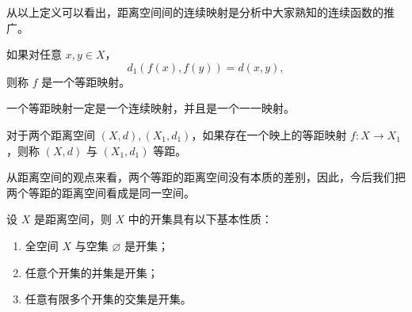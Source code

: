 从以上定义可以看出，距离空间间的连续映射是分析中大家熟知的连续函数的推广。  
\begin{definition}[等距映射]
    

如果对任意 $x,y \in X$，  
\[
d_1(f(x), f(y)) = d(x,y),
\]
则称 $f$ 是一个等距映射。  
\end{definition}
一个等距映射一定是一个连续映射，并且是一个一一映射。  

对于两个距离空间 $(X,d), (X_1,d_1)$，如果存在一个映上的等距映射 $f: X \to X_1$，则称 $(X,d)$ 与 $(X_1,d_1)$ 等距。  

从距离空间的观点来看，两个等距的距离空间没有本质的差别，因此，今后我们把两个等距的距离空间看成是同一空间。
\begin{theorem}[距离空间性质]
设 $X$ 是距离空间，则 $X$ 中的开集具有以下基本性质：
\begin{enumerate}
  \item 全空间 $X$ 与空集 $\varnothing$ 是开集；
  \item 任意个开集的并集是开集；
  \item 任意有限多个开集的交集是开集。
\end{enumerate}
\end{theorem}
